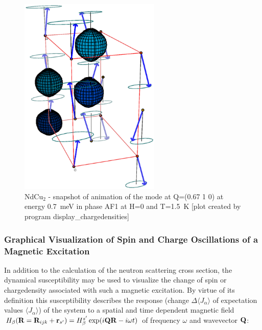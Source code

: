 \begin{figure}[ht]%
\begin{center}\leavevmode
\includegraphics[angle=-0, width=0.6\textwidth]{figsrc/animationAF1.eps}
\end{center}
\caption{NdCu$_2$ - snapshot of animation of the mode 
at Q=(0.67 1 0) at energy 0.7~meV in phase AF1 at 
H=0 and T=1.5~K [plot created by program 
{\prg display\_chargedensities}]
}\label{animationAF1}
\end{figure}

\subsubsection{Graphical Visualization of Spin and Charge Oscillations of a Magnetic Excitation}

In addition to the calculation of the neutron scattering cross section, the dynamical susceptibility may be used to %
visualize the change of spin or chargedensity associated with such a magnetic excitation. By virtue of its definition %
this susceptibility describes the response (change $\Delta \langle J_{\alpha} \rangle$ of expectation values $\langle %
J_{\alpha}\rangle$) of the system to a spatial and time dependent magnetic field $H_{\beta}(\mbf R=\mbf R_{ijk}+\mbf %
r_{s'})=H^{s'}_{\beta}
\exp(i\mbf Q \mbf R-i\omega t)$ of frequency $\omega$ and wavevector $\mathbf Q$:

